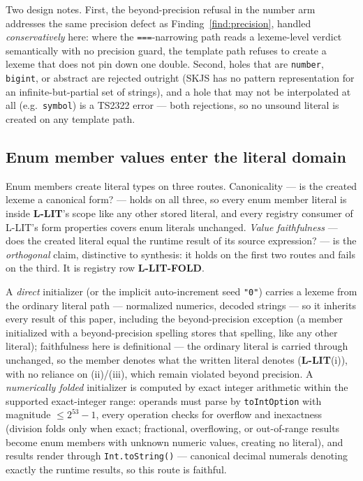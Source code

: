 \documentclass[11pt]{article}
\begin{document}
Two design notes. First, the beyond-precision refusal in the number
arm addresses the same precision defect as Finding~\ref{find:precision},
handled \emph{conservatively} here: where the \texttt{===}-narrowing
path reads a lexeme-level verdict semantically with no precision guard,
the template path refuses to create a lexeme that does not pin down one
double. Second, holes that are \texttt{number}, \texttt{bigint}, or
abstract are rejected outright (SKJS has no pattern representation for
an infinite-but-partial set of strings), and a hole that may not be
interpolated at all (e.g.\ \texttt{symbol}) is a TS2322 error ---
both rejections, so no unsound literal is created on any template path.

\subsection{Enum member values enter the literal domain}
\label{sec:enums}

Enum members create literal types on three routes. Canonicality — is the
created lexeme a canonical form? — holds on all three, so every enum
member literal is inside \textbf{L-LIT}'s scope like any other stored
literal, and every registry consumer of L-LIT's form properties covers
enum literals unchanged. \emph{Value faithfulness} — does the created literal
equal the runtime result of its source expression? — is the
\emph{orthogonal} claim, distinctive to synthesis: it holds on the
first two routes and fails on the third. It is registry row
\textbf{L-LIT-FOLD}.

A \emph{direct} initializer (or the implicit auto-increment seed
\texttt{"0"}) carries a lexeme from the ordinary literal path ---
normalized numerics, decoded strings --- so it inherits every result of
this paper, including the beyond-precision exception (a member
initialized with a beyond-precision spelling stores that spelling, like
any other literal); faithfulness here is definitional — the ordinary
literal is carried through unchanged, so the member denotes what the
written literal denotes (\textbf{L-LIT}(i)), with no reliance on
(ii)/(iii), which remain violated beyond precision. A
\emph{numerically folded} initializer is computed by exact integer
arithmetic within the supported exact-integer range: operands must parse by
\texttt{toIntOption} with magnitude $\leq 2^{53}{-}1$, every operation
checks for overflow and inexactness (division folds only when exact;
fractional, overflowing, or out-of-range results become enum members with
unknown numeric values, creating no literal), and results render through
\texttt{Int.toString()} --- canonical decimal numerals denoting exactly
the runtime results, so this route is faithful.
\end{document}
